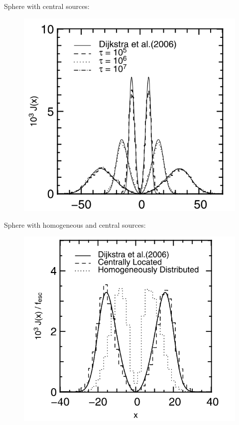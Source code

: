 \documentclass{beamer}
\begin{document}
\begin{frame}{Sphere with central sources:}
\begin{figure}
\includegraphics[scale=0.4]{Figures/sphere.png}
\end{figure}
\end{frame}

\begin{frame}{Sphere with homogeneous and central sources:}
\begin{figure}
\includegraphics[scale=0.4]{Figures/homcen.png}
\end{figure}
\end{frame}
\end{document}
